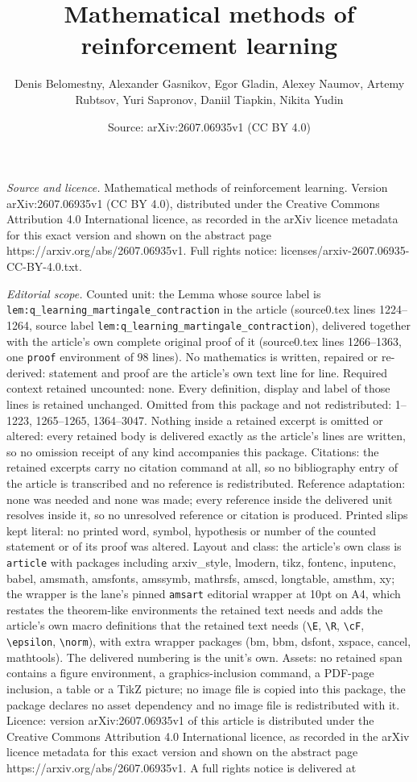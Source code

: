 \documentclass[10pt,a4paper]{amsart}
\title[Mathematical methods of reinforcement learning]{Mathematical methods of reinforcement learning}
\author{Denis Belomestny, Alexander Gasnikov, Egor Gladin, Alexey Naumov, Artemy Rubtsov, Yuri Sapronov, Daniil Tiapkin, Nikita Yudin}
\date{Source: arXiv:2607.06935v1 (CC BY 4.0)}
\begin{document}
\maketitle

\noindent\emph{Source and licence.} Mathematical methods of reinforcement learning. Version arXiv:2607.06935v1 (CC BY 4.0), distributed under the Creative Commons Attribution 4.0 International licence, as recorded in the arXiv licence metadata for this exact version and shown on the abstract page https://arxiv.org/abs/2607.06935v1. Full rights notice: licenses/arxiv-2607.06935-CC-BY-4.0.txt.\par\smallskip

\noindent\textit{Editorial scope.} Counted unit: the Lemma whose source label is \texttt{lem:q\_learning\_martingale\_contraction} in the article (source0.tex lines 1224--1264, source label \texttt{lem:q\_learning\_martingale\_contraction}), delivered together with the article's own complete original proof of it (source0.tex lines 1266--1363, one \texttt{proof} environment of 98 lines). No mathematics is written, repaired or re-derived: statement and proof are the article's own text line for line. Required context retained uncounted: none. Every definition, display and label of those lines is retained unchanged. Omitted from this package and not redistributed: 1--1223, 1265--1265, 1364--3047. Nothing inside a retained excerpt is omitted or altered: every retained body is delivered exactly as the article's lines are written, so no omission receipt of any kind accompanies this package. Citations: the retained excerpts carry no citation command at all, so no bibliography entry of the article is transcribed and no reference is redistributed. Reference adaptation: none was needed and none was made; every reference inside the delivered unit resolves inside it, so no unresolved reference or citation is produced. Printed slips kept literal: no printed word, symbol, hypothesis or number of the counted statement or of its proof was altered. Layout and class: the article's own class is \texttt{article} with packages including arxiv\_style, lmodern, tikz, fontenc, inputenc, babel, amsmath, amsfonts, amssymb, mathrsfs, amscd, longtable, amsthm, xy; the wrapper is the lane's pinned \texttt{amsart} editorial wrapper at 10pt on A4, which restates the theorem-like environments the retained text needs and adds the article's own macro definitions that the retained text needs (\texttt{\textbackslash E}, \texttt{\textbackslash R}, \texttt{\textbackslash cF}, \texttt{\textbackslash epsilon}, \texttt{\textbackslash norm}), with extra wrapper packages (bm, bbm, dsfont, xspace, cancel, mathtools). The delivered numbering is the unit's own. Assets: no retained span contains a figure environment, a graphics-inclusion command, a PDF-page inclusion, a table or a TikZ picture; no image file is copied into this package, the package declares no asset dependency and no image file is redistributed with it. Licence: version arXiv:2607.06935v1 of this article is distributed under the Creative Commons Attribution 4.0 International licence, as recorded in the arXiv licence metadata for this exact version and shown on the abstract page https://arxiv.org/abs/2607.06935v1. A full rights notice is delivered at 
\end{document}
